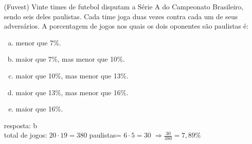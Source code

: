 \begin{ex}
(Fuvest) Vinte times de futebol disputam a Série A do Campeonato Brasileiro, sendo seis deles paulistas. Cada time joga duas vezes contra cada um de seus adversários. A porcentagem de jogos nos quais os dois oponentes são paulistas é:
   \begin{enumerate}[(a)]
   \item menor que 7\%.
   \item maior que 7\%, mas menor que 10\%.
   \item maior que 10\%, mas menor que 13\%.
   \item maior que 13\%, mas menor que 16\%.
   \item maior que 16\%.
   \end{enumerate}
     \begin{sol}
      resposta: b \\
      total de jogos: $20\cdot19=380$ \hspace{0,5cm} paulistas= $6\cdot5=30$ \hspace{0,5cm} $\Longrightarrow \frac{30}{380}=7,89\%$
     \end{sol}
\end{ex}
